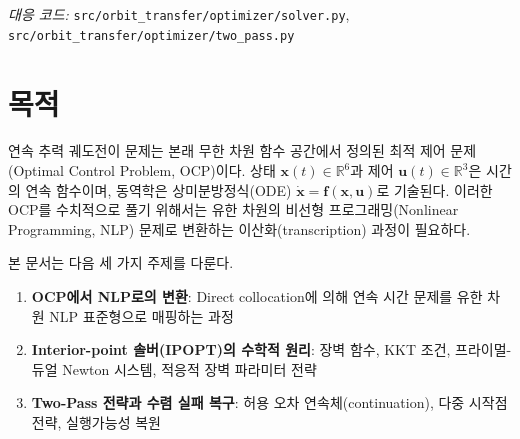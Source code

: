 \documentclass[11pt]{article}
\begin{document}
\drawborder
\thispagestyle{firstpage}

\def\lighterdate{February 12, 2026}

\begin{abstract}
연속 추력 궤도전이 문제는 본래 무한 차원 함수 공간에서 정의된 최적 제어 문제(OCP)이다.
본 문서는 OCP에서 유한 차원 비선형 프로그래밍(NLP)으로의 변환 과정,
interior-point 솔버(IPOPT)의 수학적 원리(장벽 함수, KKT 조건, 프라이멀-듀얼 Newton 시스템, 적응적 장벽 파라미터 전략),
그리고 Two-Pass 전략과 수렴 실패 복구 메커니즘을 다룬다.
구현은 CasADi의 Opti stack을 통해 NLP를 심볼릭으로 구성하고 IPOPT 솔버에 전달하는 구조이다.
\end{abstract}

\vspace{0.3cm}
\noindent\textit{대응 코드:} \texttt{src/orbit\_transfer/optimizer/solver.py}, \texttt{src/orbit\_transfer/optimizer/two\_pass.py}

\section{목적}

연속 추력 궤도전이 문제는 본래 무한 차원 함수 공간에서 정의된 최적 제어 문제(Optimal Control Problem, OCP)이다. 상태 $\mathbf{x}(t) \in \mathbb{R}^6$과 제어 $\mathbf{u}(t) \in \mathbb{R}^3$은 시간의 연속 함수이며, 동역학은 상미분방정식(ODE) $\dot{\mathbf{x}} = \mathbf{f}(\mathbf{x}, \mathbf{u})$로 기술된다. 이러한 OCP를 수치적으로 풀기 위해서는 유한 차원의 비선형 프로그래밍(Nonlinear Programming, NLP) 문제로 변환하는 이산화(transcription) 과정이 필요하다.

본 문서는 다음 세 가지 주제를 다룬다.

\begin{enumerate}[leftmargin=*]
  \item \textbf{OCP에서 NLP로의 변환}: Direct collocation에 의해 연속 시간 문제를 유한 차원 NLP 표준형으로 매핑하는 과정
  \item \textbf{Interior-point 솔버(IPOPT)의 수학적 원리}: 장벽 함수, KKT 조건, 프라이멀-듀얼 Newton 시스템, 적응적 장벽 파라미터 전략
  \item \textbf{Two-Pass 전략과 수렴 실패 복구}: 허용 오차 연속체(continuation), 다중 시작점 전략, 실행가능성 복원
\end{enumerate}
\end{document}
